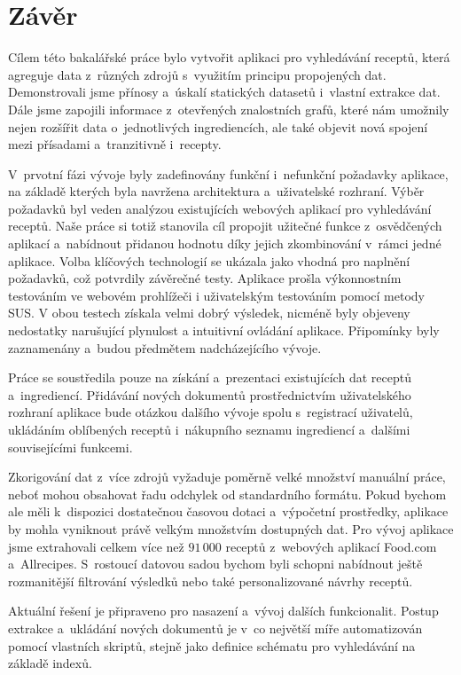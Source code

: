 \chapter*{Závěr}

Cílem této bakalářské práce bylo vytvořit aplikaci pro vyhledávání receptů, která agreguje data z~různých zdrojů s~využitím principu propojených dat. Demonstrovali jsme přínosy a~úskalí statických datasetů i~vlastní extrakce dat. Dále jsme zapojili informace z~otevřených znalostních grafů, které nám umožnily nejen rozšířit data o~jednotlivých ingrediencích, ale také objevit nová spojení mezi přísadami a~tranzitivně i~recepty.

V~prvotní fázi vývoje byly zadefinovány funkční i~nefunkční požadavky aplikace, na základě kterých byla navržena architektura a~uživatelské rozhraní. Výběr požadavků byl veden analýzou existujících webových aplikací pro vyhledávání receptů. Naše práce si totiž stanovila cíl propojit užitečné funkce z~osvědčených aplikací a~nabídnout přidanou hodnotu díky jejich zkombinování v~rámci jedné aplikace. Volba klíčových technologií se ukázala jako vhodná pro naplnění požadavků, což potvrdily závěrečné testy. Aplikace prošla výkonnostním testováním ve webovém prohlížeči i uživatelským testováním pomocí metody SUS. V obou testech získala velmi dobrý výsledek, nicméně byly objeveny nedostatky narušující plynulost a intuitivní ovládání aplikace. Připomínky byly zaznamenány a~budou předmětem nadcházejícího vývoje.

Práce se soustředila pouze na získání a~prezentaci existujících dat receptů a~ingrediencí. Přidávání nových dokumentů prostřednictvím uživatelského rozhraní aplikace bude otázkou dalšího vývoje spolu s~registrací uživatelů, ukládáním oblíbených receptů i~nákupního seznamu ingrediencí a~dalšími souvisejícími funkcemi.

Zkorigování dat z~více zdrojů vyžaduje poměrně velké množství manuální práce, neboť mohou obsahovat řadu odchylek od standardního formátu. Pokud bychom ale měli k~dispozici dostatečnou časovou dotaci a~výpočetní prostředky, aplikace by mohla vyniknout právě velkým množstvím dostupných dat. Pro vývoj aplikace jsme extrahovali celkem více než $91\,000$ receptů z~webových aplikací Food.com a~Allrecipes. S~rostoucí datovou sadou bychom byli schopni nabídnout ještě rozmanitější filtrování výsledků nebo také personalizované návrhy receptů.

Aktuální řešení je připraveno pro nasazení a~vývoj dalších funkcionalit. Postup extrakce a~ukládání nových dokumentů je v~co největší míře automatizován pomocí vlastních skriptů, stejně jako definice schématu pro vyhledávání na základě indexů.
